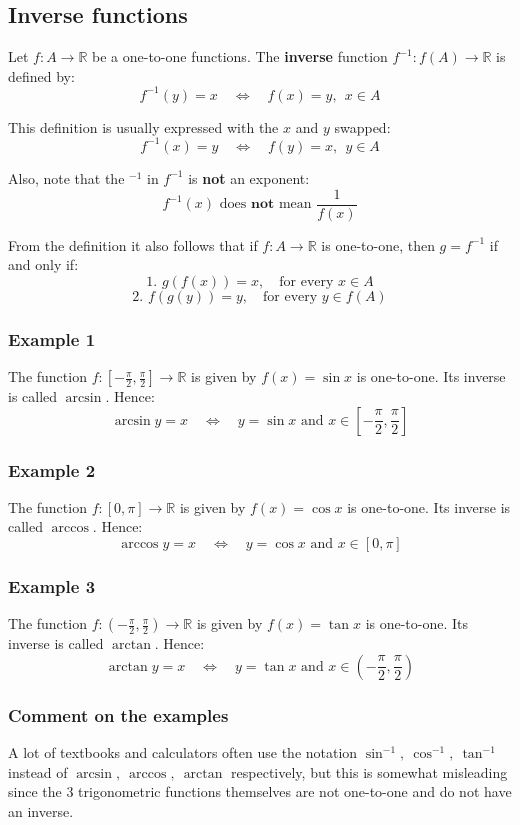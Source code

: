\documentclass[11pt]{article}
\begin{document}
\subsection{Inverse functions}
\label{sec:org934b1ee}
Let \(f : A \rightarrow \mathbb{R}\) be a one-to-one functions. The \textbf{inverse} function \(f^{-1} : f(A) \rightarrow \mathbb{R}\) is defined by:
\[f^{-1} (y) = x \quad \Leftrightarrow \quad f(x) = y, \ \ x \in A\]

This definition is usually expressed with the \(x\) and \(y\) swapped:
\[f^{-1} (x) = y \quad \Leftrightarrow \quad f(y) = x, \ \ y \in A\]

Also, note that the \(^{-1}\) in \(f^{-1}\) is \textbf{not} an exponent:
\[f^{-1} (x) \text{ does } \textbf{not } \text{mean } \frac{1}{f(x)}\]

From the definition it also follows that if \(f : A \rightarrow \mathbb{R}\) is one-to-one, then \(g = f^{-1}\) if and only if:
\[\text{1. } g(f(x)) = x, \quad \text{for every } x \in A\]
\[\text{2. } f(g(y)) = y, \quad \text{for every } y \in f(A)\]
\subsubsection{Example 1}
\label{sec:org3548463}
The function \(f : [-\frac{\pi}{2}, \frac{\pi}{2}] \rightarrow \mathbb{R}\) is given by \(f(x) = \sin x\) is one-to-one. Its inverse is called \(\arcsin\). Hence:
\[\arcsin y = x \quad \Leftrightarrow \quad y = \sin x \text{ and } x \in \left[-\frac{\pi}{2}, \frac{\pi}{2} \right]\]
\subsubsection{Example 2}
\label{sec:org77151fd}
The function \(f : [0, \pi] \rightarrow \mathbb{R}\) is given by \(f(x) = \cos x\) is one-to-one. Its inverse is called \(\arccos\). Hence:
\[\arccos y = x \quad \Leftrightarrow \quad y = \cos x \text{ and } x \in [0, \pi]\]
\subsubsection{Example 3}
\label{sec:orgd3d863d}
The function \(f : (-\frac{\pi}{2}, \frac{\pi}{2}) \rightarrow \mathbb{R}\) is given by \(f(x) = \tan x\) is one-to-one. Its inverse is called \(\arctan\). Hence:
\[\arctan y = x \quad \Leftrightarrow \quad y = \tan x \text{ and } x \in \left(-\frac{\pi}{2}, \frac{\pi}{2} \right)\]
\subsubsection{Comment on the examples}
\label{sec:orgc11ce8c}
A lot of textbooks and calculators often use the notation \(\sin^{-1}, \ \cos^{-1}, \ \tan^{-1}\) instead of \(\arcsin, \ \arccos, \ \arctan\) respectively, but this is somewhat misleading since the 3 trigonometric functions themselves are not one-to-one and do not have an inverse.
\end{document}
